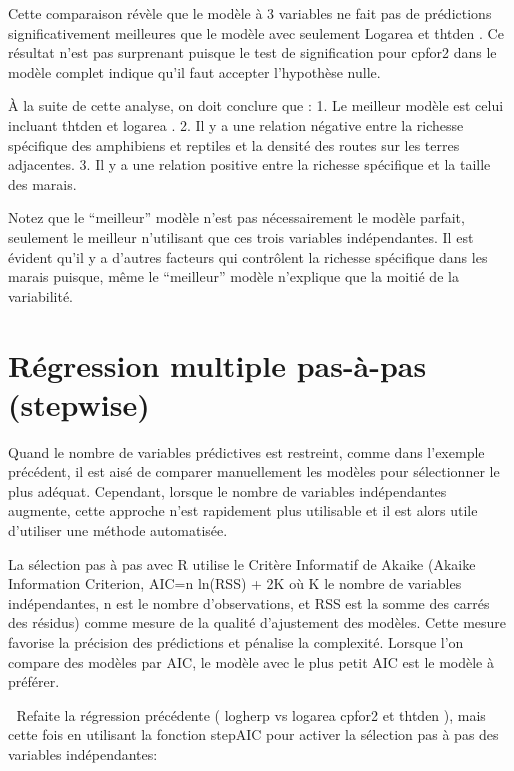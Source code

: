 \documentclass[12pt,]{book}
\begin{document}
Cette comparaison révèle que le modèle à 3 variables ne fait pas de prédictions significativement meilleures que le modèle avec seulement Logarea et thtden . Ce résultat n'est pas surprenant puisque le test de signification pour cpfor2 dans le modèle complet indique qu'il faut accepter l'hypothèse nulle.

À la suite de cette analyse, on doit conclure que :
1. Le meilleur modèle est celui incluant thtden et logarea .
2. Il y a une relation négative entre la richesse spécifique des amphibiens et reptiles et la densité des routes sur les terres adjacentes.
3. Il y a une relation positive entre la richesse spécifique et la taille des marais.

Notez que le ``meilleur'' modèle n'est pas nécessairement le modèle parfait, seulement le meilleur n'utilisant que ces trois variables indépendantes. Il est évident qu'il y a d'autres facteurs qui contrôlent la richesse spécifique dans les marais puisque, même le ``meilleur'' modèle n'explique que la moitié de la variabilité.

\hypertarget{ruxe9gression-multiple-pas-uxe0-pas-stepwise}{%
\section{Régression multiple pas-à-pas (stepwise)}\label{ruxe9gression-multiple-pas-uxe0-pas-stepwise}}

Quand le nombre de variables prédictives est restreint, comme dans l'exemple précédent, il est aisé de comparer manuellement les modèles pour sélectionner le plus adéquat. Cependant, lorsque le nombre de variables indépendantes augmente, cette approche n'est rapidement plus utilisable et il est alors utile d'utiliser une méthode automatisée.

La sélection pas à pas avec R utilise le Critère Informatif de Akaike (Akaike Information Criterion, AIC=n ln(RSS) + 2K où K le nombre de variables indépendantes, n est le nombre d'observations, et RSS est la somme des carrés des résidus) comme mesure de la qualité d'ajustement des modèles. Cette mesure favorise la précision des prédictions et pénalise la complexité. Lorsque l'on compare des modèles par AIC, le modèle avec le plus petit AIC est le modèle à préférer.

 Refaite la régression précédente ( logherp vs logarea cpfor2 et thtden ), mais cette fois en utilisant la fonction stepAIC pour activer la sélection pas à pas des variables indépendantes:
\end{document}
